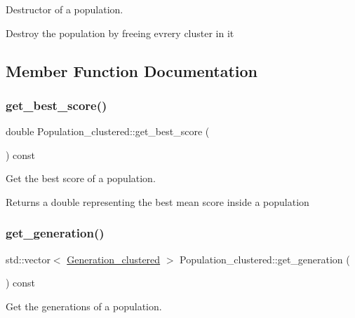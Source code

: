 Destructor of a population. 

Destroy the population by freeing evrery cluster in it 

\subsection{Member Function Documentation}
\mbox{\label{class_population__clustered_a8003d1f89c0bda4dec1578168dbca0ae}} 
\subsubsection{\texorpdfstring{get\+\_\+best\+\_\+score()}{get\_best\_score()}}
{\footnotesize\ttfamily double Population\+\_\+clustered\+::get\+\_\+best\+\_\+score (\begin{DoxyParamCaption}{ }\end{DoxyParamCaption}) const}



Get the best score of a population. 

\begin{DoxyReturn}{Returns}
a double representing the best mean score inside a population 
\end{DoxyReturn}
\mbox{\label{class_population__clustered_ab0c42e75615a2747a11ec999f049eb00}} 
\subsubsection{\texorpdfstring{get\+\_\+generation()}{get\_generation()}}
{\footnotesize\ttfamily std\+::vector$<$ \hyperlink{class_generation__clustered}{Generation\+\_\+clustered} $>$ Population\+\_\+clustered\+::get\+\_\+generation (\begin{DoxyParamCaption}{ }\end{DoxyParamCaption}) const}



Get the generations of a population. 

